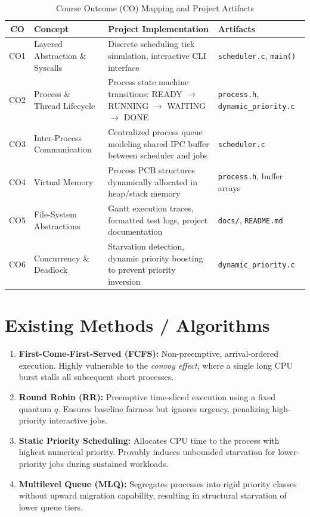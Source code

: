 \documentclass[12pt,a4paper]{report}
\begin{document}
\begin{table}[H]
\centering
\caption{Course Outcome (CO) Mapping and Project Artifacts}
\label{tab:co_mapping}
\small
\begin{tabularx}{\textwidth}{|c|p{3.2cm}|X|p{3.2cm}|}
\hline
\rowcolor{codebg}
\textbf{CO} & \textbf{Concept} & \textbf{Project Implementation} & \textbf{Artifacts} \\
\hline
CO1 & Layered Abstraction \& Syscalls & Discrete scheduling tick simulation, interactive CLI interface & \texttt{scheduler.c}, \texttt{main()} \\
\hline
CO2 & Process \& Thread Lifecycle & Process state machine transitions: READY $\to$ RUNNING $\to$ WAITING $\to$ DONE & \texttt{process.h}, \texttt{dynamic\_priority.c} \\
\hline
CO3 & Inter-Process Communication & Centralized process queue modeling shared IPC buffer between scheduler and jobs & \texttt{scheduler.c} \\
\hline
CO4 & Virtual Memory & Process PCB structures dynamically allocated in heap/stack memory & \texttt{process.h}, buffer arrays \\
\hline
CO5 & File-System Abstractions & Gantt execution traces, formatted test logs, project documentation & \texttt{docs/}, \texttt{README.md} \\
\hline
CO6 & Concurrency \& Deadlock & Starvation detection, dynamic priority boosting to prevent priority inversion & \texttt{dynamic\_priority.c} \\
\hline
\end{tabularx}
\end{table}

\section{Existing Methods / Algorithms}
\begin{enumerate}[leftmargin=1.8em, itemsep=2pt]
  \item \textbf{First-Come-First-Served (FCFS):} Non-preemptive, arrival-ordered execution. Highly vulnerable to the \textit{convoy effect}, where a single long CPU burst stalls all subsequent short processes.
  \item \textbf{Round Robin (RR):} Preemptive time-sliced execution using a fixed quantum $q$. Ensures baseline fairness but ignores urgency, penalizing high-priority interactive jobs.
  \item \textbf{Static Priority Scheduling:} Allocates CPU time to the process with highest numerical priority. Provably induces unbounded starvation for lower-priority jobs during sustained workloads.
  \item \textbf{Multilevel Queue (MLQ):} Segregates processes into rigid priority classes without upward migration capability, resulting in structural starvation of lower queue tiers.
\end{enumerate}
\end{document}

